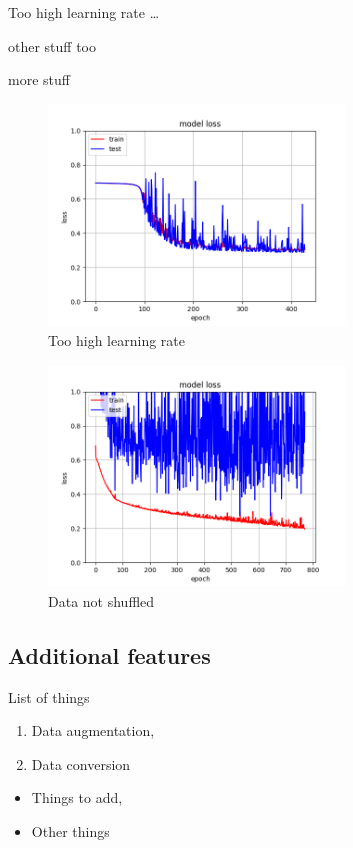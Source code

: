 Too high learning rate \dots

other stuff too

more stuff

\begin{figure}[H]
\center
\includegraphics[width=0.7\textwidth]{pictures/high_lr.png}
\caption{\label{fig:high_lr}Too high learning rate}
\end{figure}



\begin{figure}[H]
\center
\includegraphics[width=0.7\textwidth]{pictures/no_shuffle.png}
\caption{\label{fig:no_shuffle}Data not shuffled}
\end{figure}

\subsection{Additional features}


List of things
\begin{enumerate}
\item Data augmentation,
\item Data conversion
\end{enumerate}
\begin{itemize}
\item Things to add,
\item Other things
\end{itemize}


